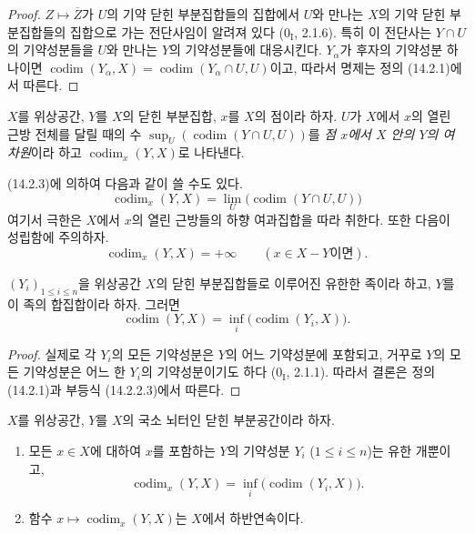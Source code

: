 \begin{proof}
$Z\mapsto\overline Z$가 $U$의 기약 닫힌 부분집합들의 집합에서 $U$와
만나는 $X$의 기약 닫힌 부분집합들의 집합으로 가는 전단사임이 알려져
있다 ($0_{\mathrm I}$, 2.1.6). 특히 이 전단사는 $Y\cap U$의
기약성분들을 $U$와 만나는 $Y$의 기약성분들에 대응시킨다. $Y_\alpha$가
후자의 기약성분 하나이면
$\operatorname{codim}(Y_\alpha,X)=
\operatorname{codim}(Y_\alpha\cap U,U)$이고, 따라서 명제는 정의
(14.2.1)에서 따른다.
\end{proof}

\begin{definition}[14.2.4]
\label{0.14.2.4-fr}
$X$를 위상공간, $Y$를 $X$의 닫힌 부분집합, $x$를 $X$의 점이라 하자.
$U$가 $X$에서 $x$의 열린 근방 전체를 달릴 때의 수
$\sup_U(\operatorname{codim}(Y\cap U,U))$를
\emph{점 $x$에서 $X$ 안의 $Y$의 여차원}이라 하고
$\operatorname{codim}_x(Y,X)$로 나타낸다.
\end{definition}

(14.2.3)에 의하여 다음과 같이 쓸 수도 있다.
\[
  \operatorname{codim}_x(Y,X)=
  \lim_U\bigl(\operatorname{codim}(Y\cap U,U)\bigr)
  \tag{14.2.4.1}\label{0.14.2.4.1-fr}
\]
여기서 극한은 $X$에서 $x$의 열린 근방들의 하향 여과집합을 따라
취한다. 또한 다음이 성립함에 주의하자.
\[
  \operatorname{codim}_x(Y,X)=+\infty\qquad(x\in X-Y\text{이면}).
\]

\begin{proposition}[14.2.5]
\label{0.14.2.5-fr}
$(Y_i)_{1\leq i\leq n}$을 위상공간 $X$의 닫힌 부분집합들로 이루어진
유한한 족이라 하고, $Y$를 이 족의 합집합이라 하자. 그러면
\[
  \operatorname{codim}(Y,X)=
  \inf_i\bigl(\operatorname{codim}(Y_i,X)\bigr).
  \tag{14.2.5.1}\label{0.14.2.5.1-fr}
\]
\end{proposition}

\begin{proof}
실제로 각 $Y_i$의 모든 기약성분은 $Y$의 어느 기약성분에 포함되고,
거꾸로 $Y$의 모든 기약성분은 어느 한 $Y_i$의 기약성분이기도 하다
($0_{\mathrm I}$, 2.1.1). 따라서 결론은 정의 (14.2.1)과 부등식
(14.2.2.3)에서 따른다.
\end{proof}

\begin{corollary}[14.2.6]
\label{0.14.2.6-fr}
$X$를 위상공간, $Y$를 $X$의 국소 뇌터인 닫힌 부분공간이라 하자.
\begin{enumerate}
  \item[\rm(i)] 모든 $x\in X$에 대하여 $x$를 포함하는 $Y$의
  기약성분 $Y_i$ ($1\leq i\leq n$)는 유한 개뿐이고,
  \[
    \operatorname{codim}_x(Y,X)=
    \inf_i\bigl(\operatorname{codim}(Y_i,X)\bigr).
  \]
  \item[\rm(ii)] 함수
  $x\mapsto\operatorname{codim}_x(Y,X)$는 $X$에서 하반연속이다.
\end{enumerate}
\end{corollary}

